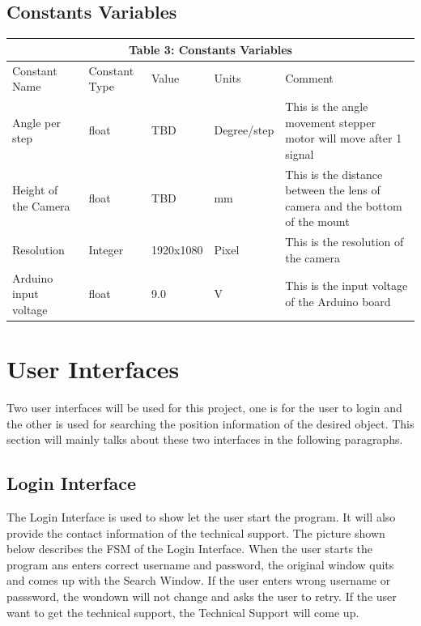 \documentclass[12pt, titlepage]{article}
\begin{document}
\subsection{Constants Variables}
\begin{tabular}{|p{}|p{}|p{}|p{}|p{}|}

\hline \multicolumn{5}{|c|}{Table 3: Constants Variables}\\

\hline Constant Name&Constant Type&Value&Units &Comment\\

\hline Angle per step&float&TBD&Degree/step&This is the angle movement stepper motor will move after 1 signal \\

\hline Height of the Camera&float&TBD&mm&This is the distance between the lens of camera and the bottom of the mount\\

\hline Resolution&Integer&1920x1080&Pixel&This is the resolution of the camera\\
\hline Arduino input voltage&float&9.0&V&This is the input voltage of the Arduino board\\


\hline

\end{tabular}




\section{User Interfaces}

Two user interfaces will be used for this project, one is for the user to login and the other is used for searching the position information of the desired object. This section will mainly talks about these two interfaces in the following paragraphs. 

\subsection{Login Interface}
The Login Interface is used to show let the user start the program. It will also provide the contact information of the technical support. The picture shown below describes the FSM of the Login Interface. When the user starts the program ans enters correct username and password, the original window quits and comes up with the Search Window. If the user enters wrong username or passsword, the wondown will not change and asks the user to retry. If the user want to get the technical support, the Technical Support will come up. 
\end{document}
